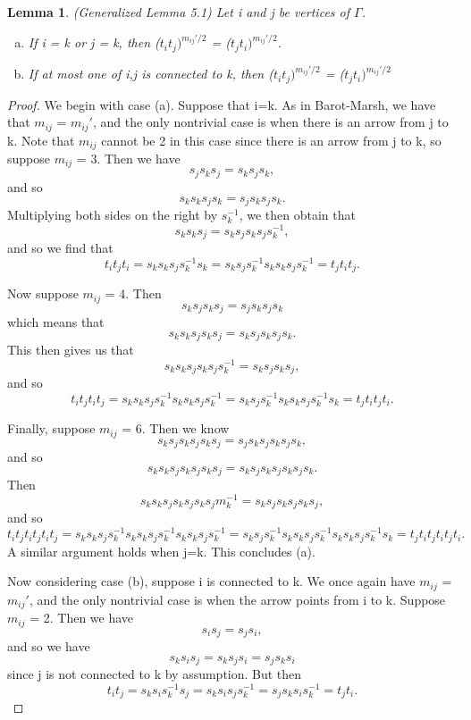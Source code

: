 \documentclass[11pt]{amsart}
\newtheorem{lem}[thm]{Lemma}
\theoremstyle{definition}
\begin{document}
\begin{lem} (Generalized Lemma 5.1) Let i and j be vertices of $\Gamma$.
\begin{enumerate}[(a)]
\item If i = k or j = k, then ($t_{i}t_{j})^{m_{ij}'/2}$ = ($t_{j}t_{i})^{m_{ij}'/2}$.
\item If at most one of i,j is connected to k, then ($t_{i}t_{j})^{m_{ij}'/2}$ = ($t_{j}t_{i})^{m_{ij}'/2}$
\end{enumerate}
\end{lem}

\begin{proof}
We begin with case (a). Suppose that i=k. As in Barot-Marsh, we have that $m_{ij}$ = $m_{ij}'$, and the only nontrivial case is when there is an arrow from j to k. Note that $m_{ij}$ cannot be 2 in this case since there is an arrow from j to k, so suppose $m_{ij}$ = 3. Then we have $$s_{j}s_{k}s_{j} = s_{k}s_{j}s_{k},$$ and so $$s_{k}s_{k}s_{j}s_{k} = s_{j}s_{k}s_{j}s_{k}.$$ Multiplying both sides on the right by $s_{k}^{-1}$, we then obtain that $$s_{k}s_{k}s_{j} = s_{k}s_{j}s_{k}s_{j}s_{k}^{-1},$$ and so we find that $$t_{i}t_{j}t_{i} = s_{k}s_{k}s_{j}s_{k}^{-1}s_{k} = s_{k}s_{j}s_{k}^{-1}s_{k}s_{k}s_{j}s_{k}^{-1} = t_{j}t_{i}t_{j}.$$

Now suppose $m_{ij}$ = 4. Then $$s_{k}s_{j}s_{k}s_{j} = s_{j}s_{k}s_{j}s_{k}$$ which means that $$s_{k}s_{k}s_{j}s_{k}s_{j} = s_{k}s_{j}s_{k}s_{j}s_{k}.$$ This then gives us that $$s_{k}s_{k}s_{j}s_{k}s_{j}s_{k}^{-1} = s_{k}s_{j}s_{k}s_{j},$$ and so $$t_{i}t_{j}t_{i}t_{j} = s_{k}s_{k}s_{j}s_{k}^{-1}s_{k}s_{k}s_{j}s_{k}^{-1} = s_{k}s_{j}s_{k}^{-1}s_{k}s_{k}s_{j}s_{k}^{-1}s_{k} = t_{j}t_{i}t_{j}t_{i}.$$

Finally, suppose $m_{ij}$ = 6. Then we know $$s_{k}s_{j}s_{k}s_{j}s_{k}s_{j} = s_{j}s_{k}s_{j}s_{k}s_{j}s_{k},$$ and so $$s_{k}s_{k}s_{j}s_{k}s_{j}s_{k}s_{j} = s_{k}s_{j}s_{k}s_{j}s_{k}s_{j}s_{k}.$$ Then $$s_{k}s_{k}s_{j}s_{k}s_{j}s_{k}s_{j}m_{k}^{-1} = s_{k}s_{j}s_{k}s_{j}s_{k}s_{j},$$ and so $$t_{i}t_{j}t_{i}t_{j}t_{i}t_{j} = s_{k}s_{k}s_{j}s_{k}^{-1}s_{k}s_{k}s_{j}s_{k}^{-1}s_{k}s_{k}s_{j}s_{k}^{-1} = s_{k}s_{j}s_{k}^{-1}s_{k}s_{k}s_{j}s_{k}^{-1}s_{k}s_{k}s_{j}s_{k}^{-1}s_{k} = t_{j}t_{i}t_{j}t_{i}t_{j}t_{i}.$$ A similar argument holds when j=k. This concludes (a).

Now considering case (b), suppose i is connected to k. We once again have $m_{ij}$ = $m_{ij}'$, and the only nontrivial case is when the arrow points from i to k. Suppose $m_{ij}$ = 2. Then we have $$s_{i}s_{j} = s_{j}s_{i},$$ and so we have $$s_{k}s_{i}s_{j} = s_{k}s_{j}s_{i} = s_{j}s_{k}s_{i}$$ since j is not connected to k by assumption. But then $$t_{i}t_{j} = s_{k}s_{i}s_{k}^{-1}s_{j} = s_{k}s_{i}s_{j}s_{k}^{-1} = s_{j}s_{k}s_{i}s_{k}^{-1} = t_{j}t_{i}.$$


\end{proof}
\end{document}
